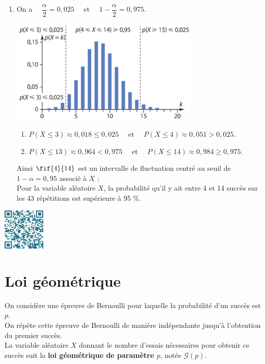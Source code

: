 \documentclass[a4paper,11pt,cours]{nsi} %
\begin{document}
\begin{exemple}[s]
\begin{enumerate}
        \item On a $\quad \dfrac{\alpha}{2}=0,025\quad$ et $\quad 1-\dfrac{\alpha
        }{2}=0,975$.
        \begin{center}
            \includegraphics[width=9cm]{fluctuation2.jpg}
        \end{center}
        \begin{enumerate}[label=\textbullet]
            \item $P(X\leqslant 3)\approx0,018\leqslant 0,025\quad$ et $\quad P(X\leqslant 4)\approx0,051>0,025$.
            \item $P(X\leqslant 13)\approx0,964< 0,975\quad$ et $\quad P(X\leqslant 14)\approx0,984 \geqslant 0,975$.
        \end{enumerate}
        Ainsi $\fif{4}{14}$ est un intervalle de fluctuation centré au seuil de $1-\alpha=0,95$ associé à $X$ :\\[.5em]
        Pour la variable aléatoire $X$, la probabilité qu'il y ait entre 4 et 14 succès sur les 43 répétitions est supérieure à 95 \%.
    \end{enumerate}
\end{exemple}

\vspace*{.5cm}
\dleft{14cm}{
    \textcolor{UGLiBlue}{Tutoriel vidéo pour calculer des intervalles de confiance dans le cadre d'une loi binomiale à l'aide de la calculatrice :}\\
}
{\includegraphics[width=2cm]{code-qr2.png}}

\section{Loi géométrique}
\begin{definition}[]
    On considère une épreuve de Bernoulli pour laquelle la probabilité d'un succès est $p$.\\
    On répète cette épreuve de Bernoulli de manière indépendante jusqu'à l'obtention du premier succès.\\
    La variable aléatoire $X$ donnant le nombre d'essais nécessaires pour obtenir ce succès suit la \textbf{loi géométrique de paramètre $p$}, notée $\mathcal{G}(p)$.
\end{definition}
\end{document}
